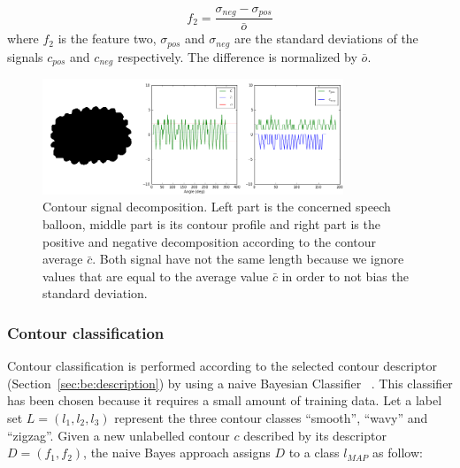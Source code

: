 \begin{equation}\label{eq:be:var_diff}
 f_2 = \frac{\sigma_{neg} - \sigma_{pos}}{\bar{o} }%
\end{equation}
where $f_2$ is the feature two, $\sigma_{pos}$ and $\sigma_{neg}$ are the standard deviations of the signals $c_{pos}$ and $c_{neg}$ respectively. The difference is normalized by $\bar{o}$.%


	\begin{figure}[!ht]	%
	  \centering
		\includegraphics[trim = 0mm 0mm 0mm 0mm, clip, width=340px]{signal_decomposition.png}
		\caption[Contour signal decomposition]{Contour signal decomposition. Left part is the concerned speech balloon, middle part is its contour profile and right part is the positive and negative decomposition according to the contour average $\bar{c}$. Both signal have not the same length because we ignore values that are equal to the average value $\bar{c}$ in order to not bias the standard deviation.}
		\label{fig:be:signal_decomposition}
	\end{figure}


\subsubsection{Contour classification}
Contour classification is performed according to the selected contour descriptor (Section~\ref{sec:be:description}) by using a naive Bayesian Classifier~\cite{Mitchell1997} .
This classifier has been chosen because it requires a small amount of training data.
Let a label set $L=(l_1,l_2,l_3)$ represent the three contour classes ``smooth'', ``wavy'' and ``zigzag''. Given a new unlabelled contour $c$ described by its descriptor $D=(f_1,f_2)$, the naive Bayes approach assigns $D$ to a class $l_{MAP}$ as follow:

